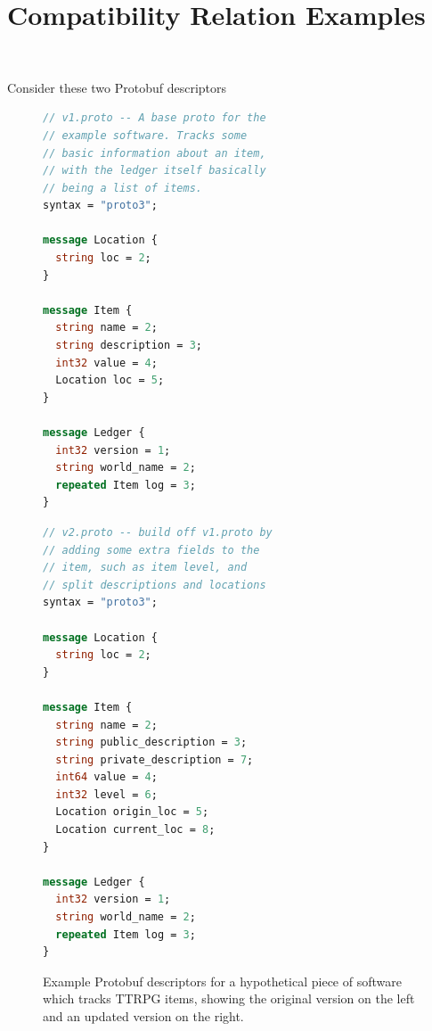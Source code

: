 \section{Compatibility Relation Examples}~\label{sec:comp-ex}

Consider these two Protobuf descriptors

\begin{figure}[H]
	\centering
	\begin{minipage}[bt]{0.43\textwidth}
		\begin{lstlisting}[language=proto]
// v1.proto -- A base proto for the
// example software. Tracks some
// basic information about an item,
// with the ledger itself basically
// being a list of items.
syntax = "proto3";

message Location {
  string loc = 2;
}

message Item {
  string name = 2;
  string description = 3;
  int32 value = 4;
  Location loc = 5;
}

message Ledger {
  int32 version = 1;
  string world_name = 2;
  repeated Item log = 3;
}\end{lstlisting}
	\end{minipage}
	\hspace{0.5cm}
	\begin{minipage}[bt]{0.48\textwidth}
		\begin{lstlisting}[language=proto]
// v2.proto -- build off v1.proto by
// adding some extra fields to the
// item, such as item level, and
// split descriptions and locations
syntax = "proto3";

message Location {
  string loc = 2;
}

message Item {
  string name = 2;
  string public_description = 3;
  string private_description = 7;
  int64 value = 4;
  int32 level = 6;
  Location origin_loc = 5;
  Location current_loc = 8;
}

message Ledger {
  int32 version = 1;
  string world_name = 2;
  repeated Item log = 3;
}\end{lstlisting}
	\end{minipage}

	\caption{Example Protobuf descriptors for a hypothetical piece of software
      which tracks TTRPG items, showing the original version on the left and an
      updated version on the right.}
	\label{fig:proto-ttrpg}
\end{figure}

